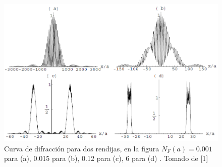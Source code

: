 \begin{figure}[h!]
\centering
\includegraphics[width=14.5cm]{Imagenes/Fig11}
\caption[Patrón de interferencia, 2 rendijas]{Curva de difracción para dos rendijas, en la figura  $N_F(a)=0.001$ para (a), 0.015 para (b), 0.12 para (c), 6 para (d) . Tomado de [1]}
\end{figure}
\newpage







